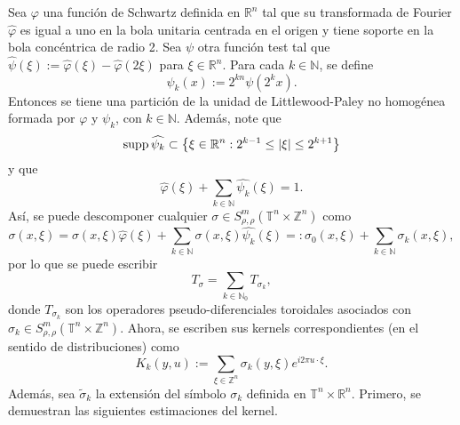 Sea $\varphi$ una función de Schwartz definida en $\mathbb{R}^n$ tal que su transformada de Fourier $\widehat{\varphi}$ es igual a uno en la bola unitaria centrada en el origen y tiene soporte en la bola concéntrica de radio 2. Sea $\psi$ otra función test tal que $\widehat{\psi}(\xi) := \widehat{\varphi}(\xi) - \widehat{\varphi}(2\xi)$ para $\xi \in \mathbb{R}^n$. Para cada $k \in \mathbb{N}$, se define
\begin{equation*}
	\psi_k(x):=2^{kn}\psi(2^kx).
\end{equation*}
Entonces se tiene una partición de la unidad de Littlewood-Paley no homogénea formada por $\varphi$ y $\psi_k$, con $k\in\mathbb{N}$. Además, note que 
\begin{equation*}
	\operatorname{supp} \widehat{\psi_k} \subset \left\{\xi \in \mathbb{R}^n : 2^{k-1} \leq |\xi|\leq 2^{k+1}\right\}
\end{equation*}
y que
\begin{equation*}
	\widehat{\varphi}(\xi) + \sum_{k\in\mathbb{N}} \widehat{\psi_k}(\xi) = 1.
\end{equation*}
Así, se puede descomponer cualquier $\sigma \in S^m_{\rho,\rho}(\mathbb{T}^n \times \mathbb{Z}^n)$ como 
\begin{equation*}
	\sigma(x,\xi) = \sigma(x,\xi)\widehat{\varphi}(\xi) + \sum_{k\in \mathbb{N}} \sigma(x,\xi)\widehat{\psi_k}(\xi) =: \sigma_0(x,\xi) + \sum_{k\in \mathbb{N}} \sigma_k(x,\xi),
\end{equation*}
por lo que se puede escribir 
\begin{equation*}
	T_\sigma = \sum_{k\in \mathbb{N}_0} T_{\sigma_k},
\end{equation*}
donde $T_{\sigma_k}$ son los operadores pseudo-diferenciales toroidales asociados con $\sigma_k \in S^m_{\rho,\rho}(\mathbb{T}^n \times \mathbb{Z}^n)$. Ahora, se escriben sus kernels correspondientes (en el sentido de distribuciones) como
\begin{equation}
	K_k(y, u) := \sum_{\xi \in \mathbb{Z}^n} \sigma_k(y, \xi)e^{i2\pi u \cdot \xi}.
	\label{eq:kernel-Kk}
\end{equation}
Además, sea $\tilde{\sigma}_k$ la extensión del símbolo $\sigma_k$ definida en $\mathbb{T}^n \times \mathbb{R}^n$. Primero, se demuestran las siguientes estimaciones del kernel.

